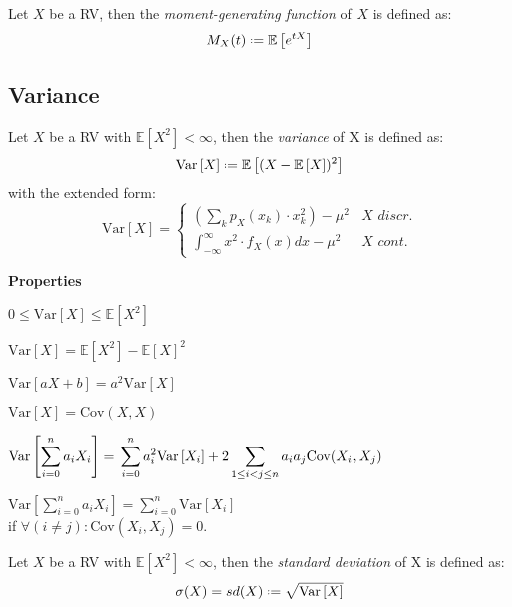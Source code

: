 \documentclass[8pt,a4paper]{extarticle}     %
\newcommand{\colnull}{\vfill\null\columnbreak}
\newcommand{\eqdef}{\mathrel{\vcenter{\baselineskip0.5ex\lineskiplimit0pt\hbox{\scriptsize.}\hbox{\scriptsize.}}}=}
\newcommand{\Var}{\mathrm{Var}}
\newcommand{\Cov}{\mathrm{Cov}}
\begin{document}
\begin{multicols}{4}
\begin{boxdefinition} 
	Let $X$ be a RV, then the \textit{moment-generating function} of $X$ is defined as: 
	\[
		M_X(t)\eqdef \mathbb{E}\left[e^{tX}\right] 
	\]
\end{boxdefinition}


\colnull
\subsection{Variance}
\begin{boxdefinition}[Variance] 
	Let $X$ be a RV with $\mathbb{E}\left[X^2\right]<\infty$, then the \textit{variance} of X is defined as:
	\[
		\Var\left[X\right] \eqdef \mathbb{E}\left[(X-\mathbb{E}\left[X\right])^2\right] 
	\]
	with the extended form:
	\[
		\Var\left[X\right] = 
		\begin{cases}
			\displaystyle \left(\sum_{k} p_X(x_k)\cdot x_k^2\right) - \mu^2 & \textit{$X$ discr.} \\[2em]
			\displaystyle \int_{-\infty}^{\infty} x^2\cdot f_X(x)dx - \mu^2& \textit{$X$ cont.}
		\end{cases}
	\]
\end{boxdefinition}
\begin{listb}
	\item [] \textbf{Properties}
	\item $0 \leq \Var\left[X\right] \leq \mathbb{E}\left[X^2\right]$
	\item $\Var\left[X\right] = \mathbb{E}\left[X^2\right]-\mathbb{E}\left[X\right]^2$ 
	\item $\Var\left[aX+b\right] = a^2\Var\left[X\right]$
	\item $\Var\left[X\right] = \Cov(X,X)$ 
	\item $\displaystyle\Var\left[\sum_{i=0}^{n}a_iX_i\right] = \\ \sum_{i=0}^{n}a_i^2\Var\left[X_i\right]+2\sum_{1\leq i < j \leq n} a_ia_j\Cov(X_i, X_j)$
	\item $\displaystyle\Var\left[\sum_{i=0}^{n}a_iX_i\right] = \sum_{i=0}^{n}\Var\left[X_i\right]$ \\if $\forall(i\neq j) : \Cov(X_i,X_j) = 0$.
\end{listb}
\begin{boxdefinition} 
	Let $X$ be a RV with $\mathbb{E}\left[X^2\right]<\infty$, then the \textit{standard deviation} of X is defined as:
	\[
		\sigma(X) = sd(X) \eqdef \sqrt{\Var\left[X\right]}	
	\]
\end{boxdefinition}
\colnull 

\end{multicols}
\end{document}
